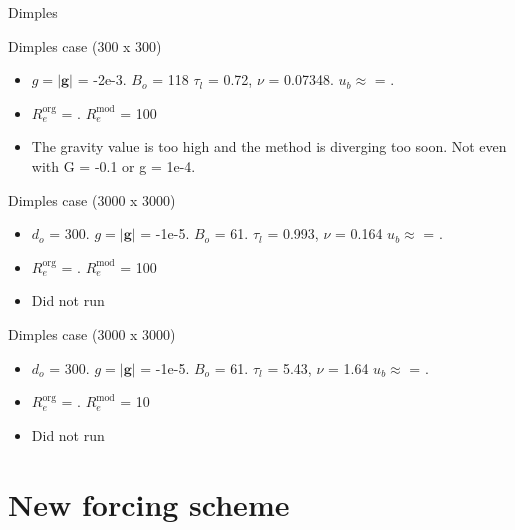 \documentclass[8pt]{beamer}
\begin{document}
	\begin{frame}[t]{Dimples}
			
		Dimples case (300 x 300)
		\begin{itemize}
			\item $g = \vert \mathbf{g}\vert $ = -2e-3. $B_o$ = 118 $\tau_l$ = 0.72, $\nu$ = 0.07348. $u_b \approx$ = . 
			\item $R_e^{\text{org}}$ = . $R_e^{\text{mod}}$ = 100
			\item The gravity value is too high and the method is diverging too soon. Not even with G = -0.1 or g = 1e-4.
		\end{itemize}	
	
		Dimples case (3000 x 3000)
		\begin{itemize}
		\item $d_o$ = 300. $g = \vert \mathbf{g}\vert $ = -1e-5. $B_o$ = 61. $\tau_l$ = 0.993, $\nu$ = 0.164 $u_b \approx$ = . 
		\item $R_e^{\text{org}}$ = . $R_e^{\text{mod}}$ = 100
		\item Did not run
	\end{itemize}	
	Dimples case (3000 x 3000)
		\begin{itemize}
			\item $d_o$ = 300. $g = \vert \mathbf{g}\vert $ = -1e-5. $B_o$ = 61. $\tau_l$ = 5.43, $\nu$ = 1.64 $u_b \approx$ = . 
			\item $R_e^{\text{org}}$ = . $R_e^{\text{mod}}$ = 10
			\item Did not run
		\end{itemize}		
	\end{frame}


	\section{New forcing scheme}
	
\end{document}
